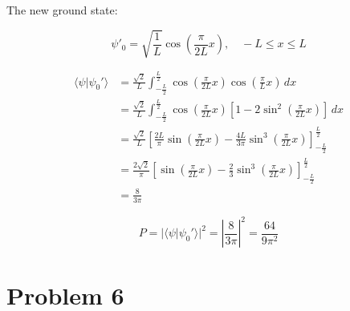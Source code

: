 \documentclass[12pt]{article}
\begin{document}
The new ground state:

\[
    \psi'_0 = \sqrt{\frac{1}{L}}\cos{(\frac{\pi}{2L}x)}, \quad -L \leq x \leq L
\]

\begin{equation*}
    \begin{split}
        \langle \psi | \psi_0' \rangle
         & = \frac{\sqrt{2}}{L} \int_{-\frac{L}{2}}^{\frac{L}{2}} \cos{(\frac{\pi}{2L}x)}\cos{(\frac{\pi}{L}x)}\,dx                                        \\
         & = \frac{\sqrt{2}}{L} \int_{-\frac{L}{2}}^{\frac{L}{2}} \cos{(\frac{\pi}{2L}x)}[1-2\sin^2{(\frac{\pi}{2L}x)}]\,dx                                \\
         & = \frac{\sqrt{2}}{L} \left[\frac{2L}{\pi}\sin{(\frac{\pi}{2L}x)} - \frac{4L}{3\pi}\sin^3{(\frac{\pi}{2L}x)}\right]_{-\frac{L}{2}}^{\frac{L}{2}} \\
         & = \frac{2\sqrt{2}}{\pi} \left[\sin{(\frac{\pi}{2L}x)} - \frac{2}{3}\sin^3{(\frac{\pi}{2L}x)}\right]_{-\frac{L}{2}}^{\frac{L}{2}}                \\
         & =  \frac{8}{3 \pi}
    \end{split}
\end{equation*}

\[
    P = |\langle \psi | \psi_0' \rangle|^2 = {|\frac{8}{3 \pi}|}^2 = \frac{64}{9\pi^2}
\]

\newpage
\section{Problem 6}
\end{document}
